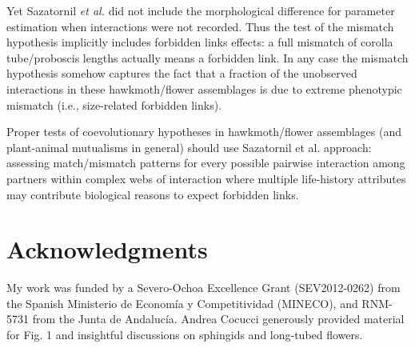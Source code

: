 \documentclass[a4paper,12pt]{article}
\begin{document}

Yet Sazatornil \textit{et al.} did not include the morphological difference for parameter estimation when interactions were not recorded. Thus the test of the mismatch hypothesis implicitly includes forbidden links effects: a full mismatch of corolla tube/proboscis lengths actually means a forbidden link. In any case the mismatch hypothesis somehow captures the fact that a fraction of the unobserved interactions in these hawkmoth/flower assemblages is due to extreme phenotypic mismatch (i.e., size-related forbidden links). 

Proper tests of coevolutionary hypotheses in hawkmoth/flower assemblages (and plant-animal mutualisms in general) should use Sazatornil et al. approach: assessing match/mismatch patterns for every possible pairwise interaction among partners within complex webs of interaction where multiple life-history attributes may contribute biological reasons to expect forbidden links.  




\section*{Acknowledgments}

My work was funded by a Severo-Ochoa Excellence Grant (SEV2012-0262) from the Spanish Ministerio de Econom\'ia y Competitividad (MINECO), and RNM-5731 from the Junta de Andaluc\'ia. Andrea Cocucci generously provided material for Fig. 1 and insightful discussions on sphingids and long-tubed flowers.

\newpage

% 
\end{document}
